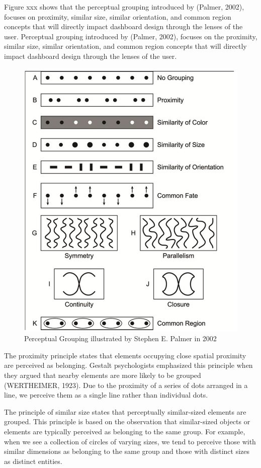 \documentclass[print]{nuthesis}
\begin{document}
Figure xxx shows that the perceptual grouping introduced by (Palmer, 2002), focuses on proximity, similar size, similar orientation, and common region concepts that will directly impact dashboard design through the lenses of the user.
Perceptual grouping introduced by (Palmer, 2002), focuses on the proximity, similar size, similar orientation, and common region concepts that will directly impact dashboard design through the lenses of the user.

\begin{figure}

{\centering \includegraphics[width=0.55\linewidth]{figure/perceptual_grouping} 

}

\caption{Perceptual Grouping illustrated by Stephen E. Palmer in 2002}\label{fig:perceptualgrouping}
\end{figure}

The proximity principle states that elements occupying close spatial proximity are perceived as belonging.
Gestalt psychologists emphasized this principle when they argued that nearby elements are more likely to be grouped (WERTHEIMER, 1923).
Due to the proximity of a series of dots arranged in a line, we perceive them as a single line rather than individual dots.

The principle of similar size states that perceptually similar-sized elements are grouped.
This principle is based on the observation that similar-sized objects or elements are typically perceived as belonging to the same group.
For example, when we see a collection of circles of varying sizes, we tend to perceive those with similar dimensions as belonging to the same group and those with distinct sizes as distinct entities.
\end{document}
